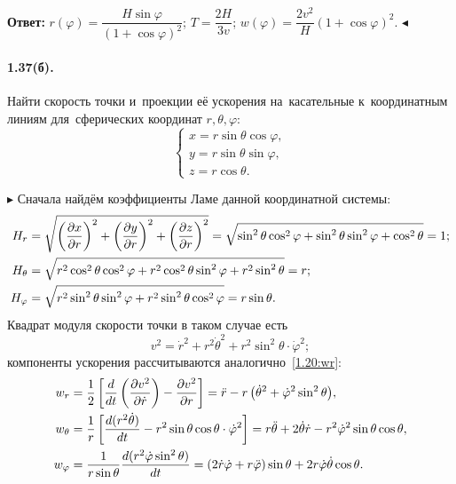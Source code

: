 \documentclass{weekly}
\begin{document}
\textbf{Ответ:}\quad
$r(\varphi) =
    \dfrac{H \sin\varphi}{\left( 1 + \cos\varphi \right)^2}$;\qquad
$T = \dfrac{2H}{3v}$;\qquad
$w(\varphi) = \dfrac{2v^2}{H} \left(1 + \cos\varphi\right)^2$.
\hfill $\blacktriangleleft$


\paragraph{1.37(б).} Найти скорость точки и~проекции её
ускорения на~касательные к~координатным линиям
для~сферических координат $r, \theta, \varphi$:
\begin{equation}
    \begin{cases}
        x = r\sin\theta\cos\varphi, \\
        y = r\sin\theta\sin\varphi, \\
        z = r\cos\theta.
    \end{cases}
\end{equation}

$\blacktriangleright$ Сначала найдём коэффициенты Ламе
данной координатной системы:
\begin{align}
    H_r &= \sqrt{\left(\frac{\partial x}{\partial r}\right)^2 +
            \left(\frac{\partial y}{\partial r}\right)^2 +
            \left(\frac{\partial z}{\partial r}\right)^2}
        = \sqrt{\sin^2\theta \cos^2\varphi +
            \sin^2\theta \sin^2\varphi +
            \cos^2\theta} = 1; \\
    H_\theta &= \sqrt{r^2 \cos^2\theta \cos^2\varphi +
            r^2 \cos^2\theta \sin^2\varphi +
            r^2 \sin^2\theta} = r; \\
    H_\varphi &= \sqrt{r^2 \sin^2\theta \sin^2\varphi +
            r^2 \sin^2\theta \cos^2\varphi} = r \sin\theta.
\end{align}
Квадрат модуля скорости точки в таком случае есть
\begin{equation}
    v^2 = \dot r^2 + r^2 \dot\theta^2 +
            r^2 \sin^2\theta \cdot \dot\varphi^2;
\end{equation}
компоненты ускорения рассчитываются аналогично~\eqref{1.20:wr}:
\begin{align}
    w_r &= \frac{1}{2} \left[ \frac{d }{d t}
            \left( \frac{\partial v^2}{\partial \dot r} \right) -
            \frac{\partial v^2}{\partial r} \right]
        = \ddot r - r \left( \dot\theta^2 +
            \dot\varphi^2 \sin^2\theta \right)\!, \\
    w_\theta &= \frac{1}{r} \left[ \frac{d (r^2 \dot\theta)}{d t} -
            r^2 \sin\theta \cos\theta \cdot \dot\varphi^2 \right]
        = r \ddot\theta + 2\dot\theta \dot r -
            r^2 \dot\varphi^2 \sin\theta \cos\theta, \\
    w_\varphi &= \frac{1}{r\sin\theta}
            \frac{d (r^2 \dot\varphi \sin^2\theta)}{d t}
        = (2 \dot r \dot\varphi + r \ddot\varphi) \sin\theta +
            2r \dot\varphi \dot\theta \cos\theta.
\end{align}
\end{document}
